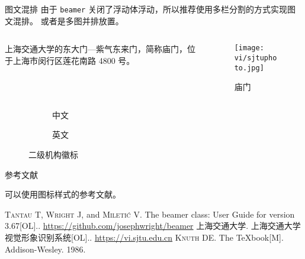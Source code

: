 \documentclass{ctexbeamer}
\begin{document}
\begin{frame}[fragile]
\begin{columns}[T]
\begin{column}{.45\textwidth}
      \begin{stampblock}{图文混排}
        由于 \texttt{beamer} 关闭了浮动体浮动，所以推荐使用多栏分割的方式实现图文混排。
        或者是多图并排放置。
        \begin{columns}
          \begin{column}{0.7\textwidth}
            上海交通大学的东大门---紫气东来门，简称庙门，位于上海市闵行区莲花南路 4800 号。
          \end{column}
          \begin{column}{0.3\textwidth}
            \begin{figure}
              \texttt{[image: vi/sjtuphoto.jpg]}
              \caption{庙门}
            \end{figure}
          \end{column}
        \end{columns}
        \begin{figure}
          \begin{subfigure}{0.4\textwidth}
            \caption{中文}
          \end{subfigure}\hspace*{20pt}
          \begin{subfigure}{0.4\textwidth}
            \caption{英文}
          \end{subfigure}
          \caption{二级机构徽标}
        \end{figure}
      \end{stampblock}

      \begin{stampblock}{参考文献}

        可以使用图标样式的参考文献。

        \begin{bibliolist}{00}
          \onlineitem \textsc{Tantau T}, \textsc{Wright J}, and
          \textsc{Mileti\'c V}.\newblock
          The beamer class: User Guide for version 3.67[OL].. \url{https://github.com/josephwright/beamer}
          \articleitem \textsc{上海交通大学}.\newblock
          上海交通大学视觉形象识别系统[OL].. \url{https://vi.sjtu.edu.cn}
          \bookitem \textsc{Knuth DE}.\newblock
          The \TeX{}book[M].\newblock
          Addison-Wesley. 1986.
        \end{bibliolist}


\end{stampblock}
\end{column}
\end{columns}
\end{frame}
\end{document}
